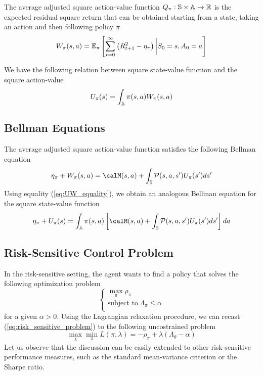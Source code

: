 \begin{definition}
	The average adjusted square action-value function $Q_\pi : \S \times \A \to 
	\R$ is the expected residual square return that can be obtained starting from a
	state, taking an action and then following policy $\pi$
	\begin{equation}
		W_\pi(s, a) = \E[\pi]{\sum^{\infty}_{t=0} \left(R_{t+1}^2 -
			\eta_\pi\right) \bigg| S_0 = s, A_0 = a}
	\end{equation}
\end{definition}
We have the following relation between square state-value function and the
square action-value
\begin{equation}\label{eq:UW_equality}
	U_\pi(s) = \int_\A \pi(s,a) W_\pi(s,a)
\end{equation}

\subsection{Bellman Equations}
The average adjusted square action-value function satisfies the following 
Bellman equation
\begin{equation}
	\eta_\pi + W_\pi(s,a) = \calM(s,a) + \int_\S \calP(s,a,s') U_\pi(s') ds'\\
\end{equation}
Using equality (\ref{eq:UW_equality}), we obtain an analogous Bellman equation
for the square state-value function
\begin{equation}
	\eta_\pi + U_\pi(s) = \int_\A \pi(s,a)\left[\calM(s,a) + \int_\S 
	\calP(s,a,s') U_\pi(s') ds'\right]da
\end{equation}

\subsection{Risk-Sensitive Control Problem}
In the risk-sensitive setting, the agent wants to find a policy that solves the 
following optimization problem 
\begin{equation}\label{eq:risk_sensitive_problem}
	\begin{cases}
		\max_\pi \rho_\pi\\
		\text{subject to}\ \Lambda_\pi \leq \alpha\\
	\end{cases}
\end{equation}
for a given $\alpha > 0$. Using the Lagrangian relaxation procedure, we can 
recast (\ref{eq:risk_sensitive_problem}) to the following uncostrained problem
\begin{equation}
	\max_\lambda \min_\pi L(\pi, \lambda) = - \rho_\pi + \lambda 
	(\Lambda_\theta - \alpha)
\end{equation}
Let us observe that the discussion can be easily extended to other
risk-sensitive performance measures, such as the standard mean-variance
criterion or the Sharpe ratio. 
